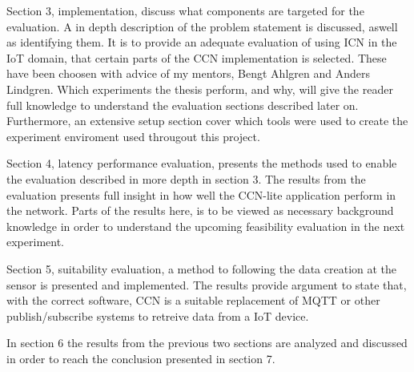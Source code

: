 Section 3, implementation, discuss what components are targeted for the evaluation. A in depth description of the problem statement is discussed, aswell as identifying them. It is to provide an adequate evaluation of using ICN in the IoT domain, that certain parts of the CCN implementation is selected. These have been choosen with advice of my mentors, Bengt Ahlgren and Anders Lindgren. Which experiments the thesis perform, and why, will give the reader full knowledge to understand the evaluation sections described later on. Furthermore, an extensive setup section cover which tools were used to create the experiment enviroment used througout this project.

Section 4, latency performance evaluation, presents the methods used to enable the evaluation described in more depth in section 3. The results from the evaluation presents full insight in how well the CCN-lite application perform in the network. Parts of the results here, is to be viewed as necessary background knowledge in order to understand the upcoming feasibility evaluation in the next experiment.

Section 5, suitability evaluation, a method to following the data creation at the sensor is presented and implemented. The results provide argument to state that, with the correct software, CCN is a suitable replacement of MQTT or other publish/subscribe systems to retreive data from a IoT device. 

In section 6 the results from the previous two sections are analyzed and discussed in order to reach the conclusion presented in section 7.
